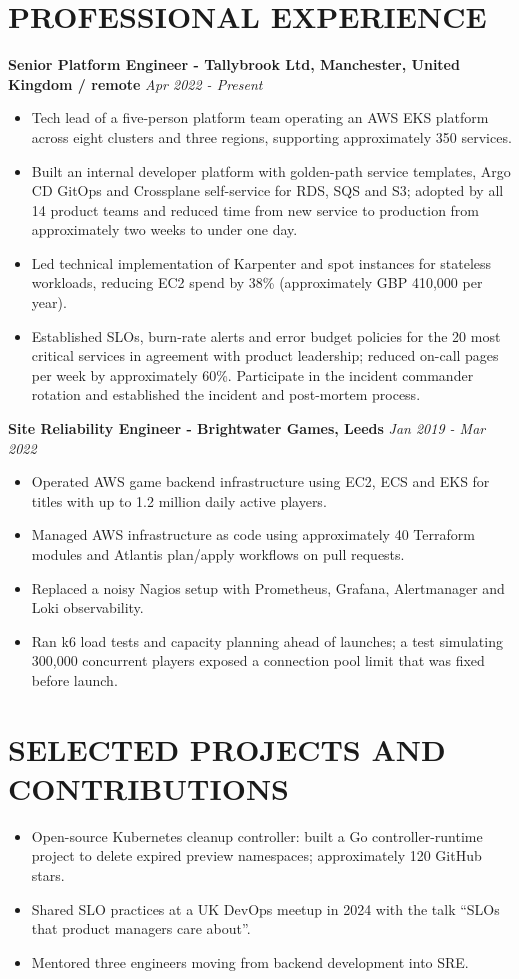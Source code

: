 \documentclass[11pt,a4paper]{article}
\begin{document}
\section*{PROFESSIONAL EXPERIENCE}
\textbf{Senior Platform Engineer - Tallybrook Ltd, Manchester, United Kingdom / remote} \hfill \textit{Apr 2022 - Present}
\begin{itemize}
\item Tech lead of a five-person platform team operating an AWS EKS platform across eight clusters and three regions, supporting approximately 350 services.
\item Built an internal developer platform with golden-path service templates, Argo CD GitOps and Crossplane self-service for RDS, SQS and S3; adopted by all 14 product teams and reduced time from new service to production from approximately two weeks to under one day.
\item Led technical implementation of Karpenter and spot instances for stateless workloads, reducing EC2 spend by 38\% (approximately GBP 410,000 per year).
\item Established SLOs, burn-rate alerts and error budget policies for the 20 most critical services in agreement with product leadership; reduced on-call pages per week by approximately 60\%. Participate in the incident commander rotation and established the incident and post-mortem process.
\end{itemize}

\textbf{Site Reliability Engineer - Brightwater Games, Leeds} \hfill \textit{Jan 2019 - Mar 2022}
\begin{itemize}
\item Operated AWS game backend infrastructure using EC2, ECS and EKS for titles with up to 1.2 million daily active players.
\item Managed AWS infrastructure as code using approximately 40 Terraform modules and Atlantis plan/apply workflows on pull requests.
\item Replaced a noisy Nagios setup with Prometheus, Grafana, Alertmanager and Loki observability.
\item Ran k6 load tests and capacity planning ahead of launches; a test simulating 300,000 concurrent players exposed a connection pool limit that was fixed before launch.
\end{itemize}

\section*{SELECTED PROJECTS AND CONTRIBUTIONS}
\begin{itemize}
\item Open-source Kubernetes cleanup controller: built a Go controller-runtime project to delete expired preview namespaces; approximately 120 GitHub stars.
\item Shared SLO practices at a UK DevOps meetup in 2024 with the talk “SLOs that product managers care about”.
\item Mentored three engineers moving from backend development into SRE.
\end{itemize}
\end{document}
